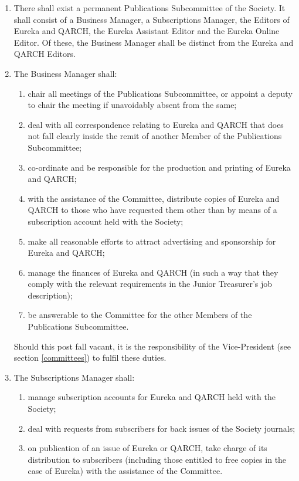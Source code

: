 \documentclass{article}
\begin{document}
\begin{enumerate}
\item There shall exist a permanent Publications Subcommittee of the Society.
It shall consist of a Business Manager, a Subscriptions Manager, the Editors of Eureka and QARCH, the Eureka Assistant Editor and the Eureka
Online Editor. Of these, the Business Manager shall be distinct from the
Eureka and QARCH Editors.
\item The Business Manager shall:
  \begin{enumerate}
  \item chair all meetings of the Publications Subcommittee, or appoint a
  deputy to chair the meeting if unavoidably absent from the same;
  \item deal with all correspondence relating to Eureka and QARCH that
  does not fall clearly inside the remit of another Member of the Publications Subcommittee;
  \item co-ordinate and be responsible for the production and printing of
  Eureka and QARCH;
  \item with the assistance of the Committee, distribute copies of Eureka and
  QARCH to those who have requested them other than by means of
  a subscription account held with the Society;
  \item make all reasonable efforts to attract advertising and sponsorship for
  Eureka and QARCH;
  \item manage the finances of Eureka and QARCH (in such a way that they
  comply with the relevant requirements in the Junior Treasurer's job
  description);
  \item be answerable to the Committee for the other Members of the Publications Subcommittee.
  \end{enumerate}
	Should this post fall vacant, it is the responsibility of the Vice-President (see section \ref{committees}) to fulfil these duties.\\
\item The Subscriptions Manager shall:
  \begin{enumerate}
  \item manage subscription accounts for Eureka and QARCH held with the
  Society;
  \item deal with requests from subscribers for back issues of the Society
  journals;
  \item on publication of an issue of Eureka or QARCH, take charge of its
  distribution to subscribers (including those entitled to free copies in
  the case of Eureka) with the assistance of the Committee.

\end{enumerate}
\end{enumerate}
\end{document}
